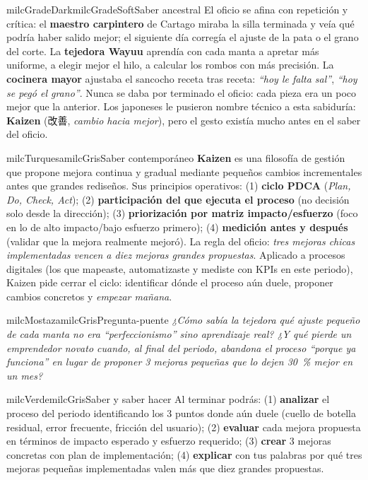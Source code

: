 \documentclass[11pt,letterpaper]{article}
\begin{document}
\begin{softbox}{milcGradeDark}{milcGradeSoft}{Saber ancestral}
El oficio se afina con repetición y crítica: el \textbf{maestro carpintero} de Cartago miraba la silla terminada y veía qué podría haber salido mejor; el siguiente día corregía el ajuste de la pata o el grano del corte. La \textbf{tejedora Wayuu} aprendía con cada manta a apretar más uniforme, a elegir mejor el hilo, a calcular los rombos con más precisión. La \textbf{cocinera mayor} ajustaba el sancocho receta tras receta: \emph{``hoy le falta sal''}, \emph{``hoy se pegó el grano''}. Nunca se daba por terminado el oficio: cada pieza era un poco mejor que la anterior. Los japoneses le pusieron nombre técnico a esta sabiduría: \textbf{Kaizen} (改善, \emph{cambio hacia mejor}), pero el gesto existía mucho antes en el saber del oficio.
\end{softbox}

\begin{softbox}{milcTurquesa}{milcGris}{Saber contemporáneo}
\textbf{Kaizen} es una filosofía de gestión que propone mejora continua y gradual mediante pequeños cambios incrementales antes que grandes rediseños. Sus principios operativos: (1) \textbf{ciclo PDCA} (\emph{Plan, Do, Check, Act}); (2) \textbf{participación del que ejecuta el proceso} (no decisión solo desde la dirección); (3) \textbf{priorización por matriz impacto/esfuerzo} (foco en lo de alto impacto/bajo esfuerzo primero); (4) \textbf{medición antes y después} (validar que la mejora realmente mejoró). La regla del oficio: \emph{tres mejoras chicas implementadas vencen a diez mejoras grandes propuestas}. Aplicado a procesos digitales (los que mapeaste, automatizaste y mediste con KPIs en este periodo), Kaizen pide cerrar el ciclo: identificar dónde el proceso aún duele, proponer cambios concretos y \emph{empezar mañana}.
\end{softbox}

\begin{softbox}{milcMostaza}{milcGris}{Pregunta-puente}
\textit{¿Cómo sabía la tejedora qué ajuste pequeño de cada manta no era \emph{``perfeccionismo''} sino \emph{aprendizaje real}? ¿Y qué pierde un emprendedor novato cuando, al final del periodo, abandona el proceso \emph{``porque ya funciona''} en lugar de proponer 3 mejoras pequeñas que lo dejen 30~\% mejor en un mes?}
\end{softbox}

\begin{softbox}{milcVerde}{milcGris}{Saber y saber hacer}
Al terminar podrás: (1) \textbf{analizar} el proceso del periodo identificando los 3 puntos donde aún duele (cuello de botella residual, error frecuente, fricción del usuario); (2) \textbf{evaluar} cada mejora propuesta en términos de impacto esperado y esfuerzo requerido; (3) \textbf{crear} 3 mejoras concretas con plan de implementación; (4) \textbf{explicar} con tus palabras por qué tres mejoras pequeñas implementadas valen más que diez grandes propuestas.
\end{softbox}
\end{document}
